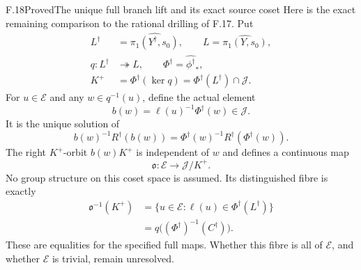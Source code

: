 \begin{claim}{F.18}{Proved}{The unique full branch lift and its exact source coset}
Here is the exact remaining comparison to the
rational drilling of F.17.  Put
\[
\begin{split}
 L^\dagger&=\widehat{\pi_1(Y^\dagger,s_0)},\qquad
 L=\widehat{\pi_1(Y,s_0)},\\
 q:L^\dagger&\twoheadrightarrow L,\qquad
 \Phi^\dagger=\widehat{\phi^\dagger}_*,\\
 K^+&=\Phi^\dagger(\ker q)
          =\Phi^\dagger(L^\dagger)\cap\mathcal J .
\end{split}                                                     \tag{F.18.6}
\]
For $u\in\mathcal E$ and any $w\in q^{-1}(u)$,
define the actual element
\[
             b(w)=\ell(u)^{-1}\Phi^\dagger(w)\in\mathcal J .
                                                               \tag{F.18.7}
\]
It is the unique solution of
\[
 b(w)^{-1}R^\dagger(b(w))
       =\Phi^\dagger(w)^{-1}R^\dagger(\Phi^\dagger(w)).
                                                               \tag{F.18.8}
\]
The right $K^+$-orbit $b(w)K^+$ is independent of $w$
and defines a continuous map
\[
 \mathfrak o:\mathcal E\longrightarrow\mathcal J/K^+ .
                                                               \tag{F.18.9}
\]
No group structure on this coset space is assumed.
Its distinguished fibre is exactly
\[
\begin{split}
 \mathfrak o^{-1}(K^+)
   &=\{u\in\mathcal E:
                 \ell(u)\in\Phi^\dagger(L^\dagger)\}\\
   &=q\bigl((\Phi^\dagger)^{-1}(C^\dagger)\bigr).
\end{split}                                                     \tag{F.18.10}
\]
These are equalities for the specified full maps.
Whether this fibre is all of $\mathcal E$, and
whether $\mathcal E$ is trivial, remain unresolved.
\end{claim}

